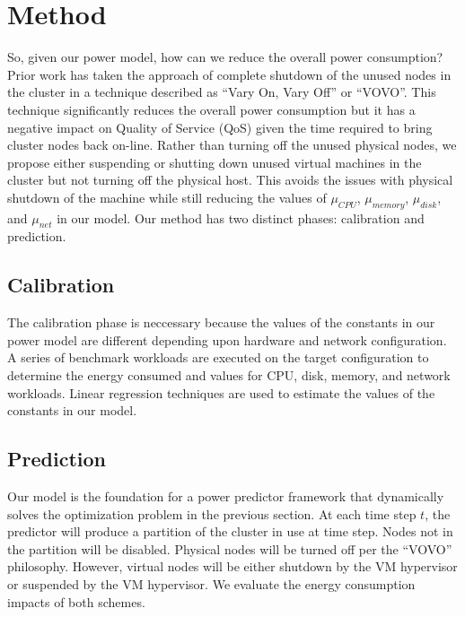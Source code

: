 \documentclass[times, 10pt,twocolumn]{article}
\begin{document}
\section{Method}
\label{sec:powerapply}
So, given our power model, how can we reduce the overall power consumption?
Prior work \cite{Pinheiro2003} \cite{Hermenier2007} has taken the approach of
complete shutdown of the unused nodes in the cluster in a technique described
as ``Vary On, Vary Off'' or ``VOVO''.  This technique significantly
reduces the overall power consumption but it has a negative impact on Quality
of Service (QoS) given the time required to bring cluster nodes back
on-line. Rather than turning off the unused physical nodes, we propose either
suspending or shutting down unused virtual machines in the cluster but not
turning off the physical host.  This avoids
the issues with physical shutdown of the machine while still reducing the
values of $\mu_{CPU}$, $\mu_{memory}$, $\mu_{disk}$, and $\mu_{net}$ in
our model. Our method has two distinct phases: calibration and
prediction. 

\subsection{Calibration}
\label{sec:methodcalibrate}
The calibration phase is neccessary because the values of the constants
in our power model are different depending upon hardware and network
configuration. A series of benchmark workloads are executed on the
target configuration to determine the energy consumed and values for
CPU, disk, memory, and network workloads.   Linear regression techniques
are used to estimate the values of the constants in our model.

\subsection{Prediction}
\label{methodprediction}
Our model is the foundation for a power predictor framework that
dynamically solves the optimization problem in the previous section. At
each time step $t$, the predictor will produce a partition of the
cluster in use at time step.  Nodes not in the partition will be
disabled.  Physical nodes will be turned off per the ``VOVO''
philosophy.  However, virtual nodes will be either shutdown by the VM
hypervisor or suspended by the VM hypervisor.   We evaluate the energy
consumption impacts of both schemes.
\end{document}
